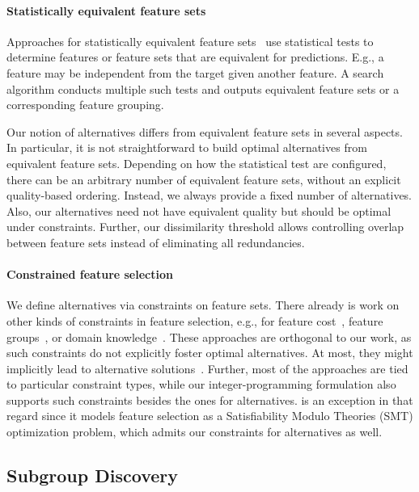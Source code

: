 \documentclass{article}
\theoremstyle{definition}
\begin{document}
\paragraph{Statistically equivalent feature sets}

Approaches for statistically equivalent feature sets~\cite{borboudakis2021extending, lagani2017feature} use statistical tests to determine features or feature sets that are equivalent for predictions.
E.g., a feature may be independent from the target given another feature.
A search algorithm conducts multiple such tests and outputs equivalent feature sets or a corresponding feature grouping.

Our notion of alternatives differs from equivalent feature sets in several aspects.
In particular, it is not straightforward to build optimal alternatives from equivalent feature sets.
Depending on how the statistical test are configured, there can be an arbitrary number of equivalent feature sets, without an explicit quality-based ordering.
Instead, we always provide a fixed number of alternatives.
Also, our alternatives need not have equivalent quality but should be optimal under constraints.
Further, our dissimilarity threshold allows controlling overlap between feature sets instead of eliminating all redundancies.

\paragraph{Constrained feature selection}

We define alternatives via constraints on feature sets.
There already is work on other kinds of constraints in feature selection, e.g., for feature cost~\cite{paclik2002feature}, feature groups~\cite{yuan2006model}, or domain knowledge~\cite{bach2022empirical, groves2015toward}.
These approaches are orthogonal to our work, as such constraints do not explicitly foster optimal alternatives.
At most, they might implicitly lead to alternative solutions~\cite{bach2022empirical}.
Further, most of the approaches are tied to particular constraint types, while our integer-programming formulation also supports such constraints besides the ones for alternatives.
\cite{bach2022empirical} is an exception in that regard since it models feature selection as a Satisfiability Modulo Theories (\textsc{SMT}) optimization problem, which admits our constraints for alternatives as well.

\subsection{Subgroup Discovery}
\label{sec:afs:related-work:subgroup-discovery}
\end{document}
